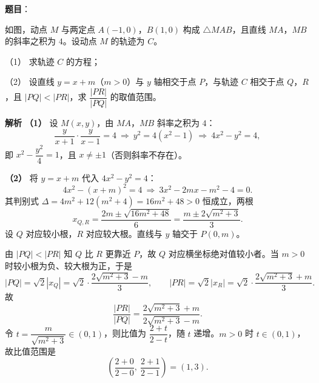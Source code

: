 \begin{answer}

\textbf{题目}：

如图，动点 $M$ 与两定点 $A(-1,0)$，$B(1,0)$ 构成 $\triangle MAB$，且直线 $MA$，$MB$ 的斜率之积为 $4$。设动点 $M$ 的轨迹为 $C$。

（1） 求轨迹 $C$ 的方程；

（2） 设直线 $y=x+m$（$m>0$）与 $y$ 轴相交于点 $P$，与轨迹 $C$ 相交于点 $Q$，$R$，且 $|PQ|<|PR|$，求 $\dfrac{|PR|}{|PQ|}$ 的取值范围。
\nopagebreak[4]
\begin{center}\end{center}
\nopagebreak[4]
\textbf{解析}
\textbf{（1）} 设 $M(x,y)$，由 $MA$，$MB$ 斜率之积为 $4$：
\nopagebreak[4]
\[\frac{y}{x+1}\cdot\frac{y}{x-1}=4\ \Rightarrow\ y^2=4\left(x^2-1\right)\ \Rightarrow\ 4x^2-y^2=4,\]
即 $x^2-\dfrac{y^2}4=1$，且 $x\neq\pm1$（否则斜率不存在）。

\textbf{（2）} 将 $y=x+m$ 代入 $4x^2-y^2=4$：
\nopagebreak[4]
\[4x^2-(x+m)^2=4\ \Rightarrow\ 3x^2-2mx-m^2-4=0.\]
其判别式 $\Delta=4m^2+12\left(m^2+4\right)=16m^2+48>0$ 恒成立，两根
\nopagebreak[4]
\[x_{Q,R}=\frac{2m\pm\sqrt{16m^2+48}}{6}=\frac{m\pm2\sqrt{m^2+3}}{3}.\]
设 $Q$ 对应较小根，$R$ 对应较大根。直线与 $y$ 轴交于 $P(0,m)$。

由 $|PQ|<|PR|$ 知 $Q$ 比 $R$ 更靠近 $P$，故 $Q$ 对应横坐标绝对值较小者。当 $m>0$ 时较小根为负、较大根为正，于是
\nopagebreak[4]
\[|PQ|=\sqrt2\left|x_Q\right|=\sqrt2\cdot\frac{2\sqrt{m^2+3}-m}{3},\qquad |PR|=\sqrt2\left|x_R\right|=\sqrt2\cdot\frac{2\sqrt{m^2+3}+m}{3}.\]
故
\nopagebreak[4]
\[\frac{|PR|}{|PQ|}=\frac{2\sqrt{m^2+3}+m}{2\sqrt{m^2+3}-m}.\]
令 $t=\dfrac{m}{\sqrt{m^2+3}}\in(0,1)$，则比值为 $\dfrac{2+t}{2-t}$，随 $t$ 递增。$m>0$ 时 $t\in(0,1)$，故比值范围是
\nopagebreak[4]
\[\left(\frac{2+0}{2-0},\ \frac{2+1}{2-1}\right)=(1,3).\]



\end{answer}
